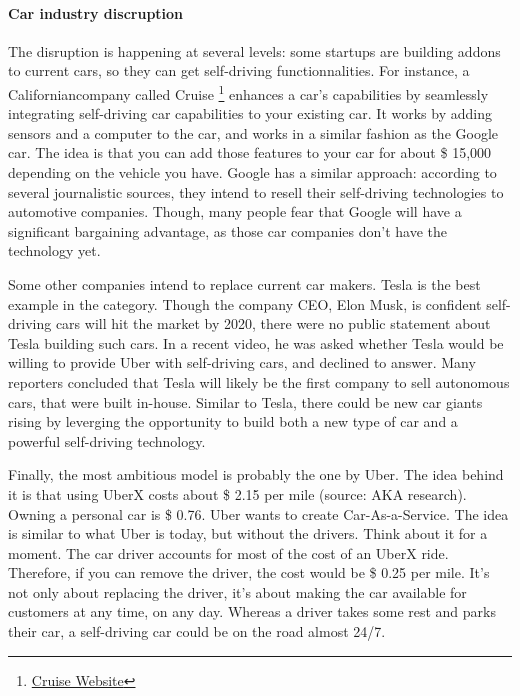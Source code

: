 \documentclass[12pt]{article}
\begin{document}
\paragraph{Car industry discruption}

The disruption is happening at several levels: some startups are building addons
to current cars, so they can get self-driving functionnalities. For instance,
a Californiancompany called Cruise
\footnote{\href{http://www.getcruise.com}{Cruise Website}}
enhances a car's capabilities by seamlessly integrating self-driving car
capabilities to your existing car. It works by adding sensors and a computer to
the car, and works in a similar fashion as the Google car. The idea is that you
can add those features to your car for about \$ 15,000 depending on the vehicle
you have. Google has a similar approach: according to several journalistic
sources, they intend to resell their self-driving technologies to automotive
companies. Though, many people fear that Google will have a significant
bargaining advantage, as those car companies don't have the technology yet.

Some other companies intend to replace current car makers. Tesla is the best
example in the category. Though the company CEO, Elon Musk, is confident
self-driving cars will hit the market by 2020, there were no public statement
about Tesla building such cars. In a recent video, he was asked whether Tesla
would be willing to provide Uber with self-driving cars, and declined to answer.
Many reporters concluded that Tesla will likely be the first company to sell
autonomous cars, that were built in-house. Similar to Tesla, there could be new
car giants rising by leverging the opportunity to build both a new type of car
and a powerful self-driving technology.

Finally, the most ambitious model is probably the one by Uber. The idea behind
it is that using UberX costs about \$ 2.15 per mile (source: AKA research).
Owning a personal car is \$ 0.76. Uber wants to create Car-As-a-Service.
The idea is similar to what Uber is today, but without the drivers. Think about
it for a moment. The car driver accounts for most of the cost of an UberX ride.
Therefore, if you can remove the driver, the cost would be \$ 0.25 per mile.
It's not only about replacing the driver, it's about making the car available
for customers at any time, on any day. Whereas a driver takes some rest and
parks their car, a self-driving car could be on the road almost 24/7.
\end{document}
